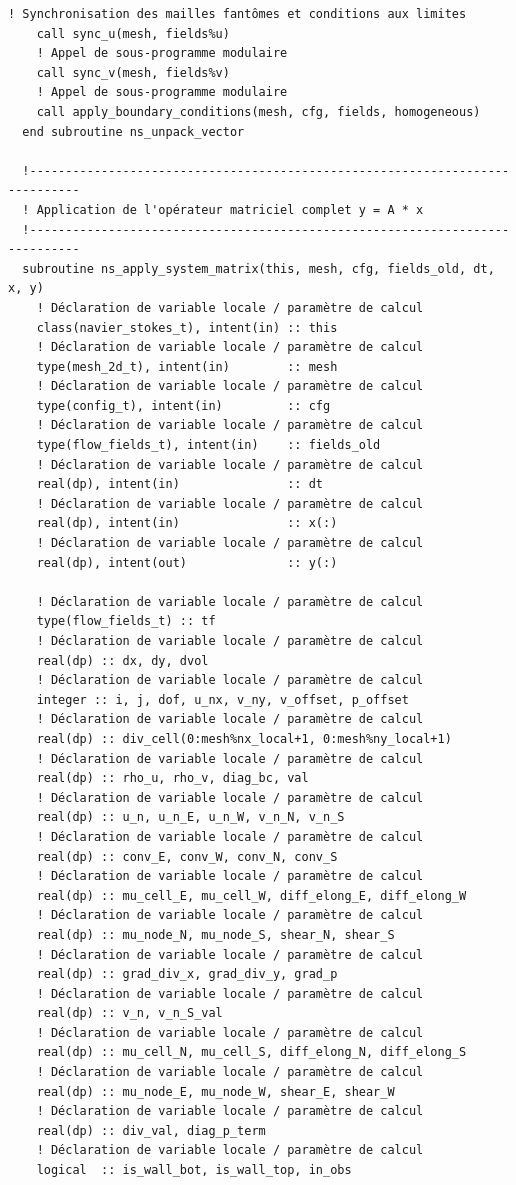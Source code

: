 \documentclass[10pt,a4paper,oneside]{book}
\begin{document}
\begin{lstlisting}[language={[95]Fortran}]
    ! Synchronisation des mailles fantômes et conditions aux limites
    call sync_u(mesh, fields%u)
    ! Appel de sous-programme modulaire
    call sync_v(mesh, fields%v)
    ! Appel de sous-programme modulaire
    call apply_boundary_conditions(mesh, cfg, fields, homogeneous)
  end subroutine ns_unpack_vector

  !-----------------------------------------------------------------------------
  ! Application de l'opérateur matriciel complet y = A * x
  !-----------------------------------------------------------------------------
  subroutine ns_apply_system_matrix(this, mesh, cfg, fields_old, dt, x, y)
    ! Déclaration de variable locale / paramètre de calcul
    class(navier_stokes_t), intent(in) :: this
    ! Déclaration de variable locale / paramètre de calcul
    type(mesh_2d_t), intent(in)        :: mesh
    ! Déclaration de variable locale / paramètre de calcul
    type(config_t), intent(in)         :: cfg
    ! Déclaration de variable locale / paramètre de calcul
    type(flow_fields_t), intent(in)    :: fields_old
    ! Déclaration de variable locale / paramètre de calcul
    real(dp), intent(in)               :: dt
    ! Déclaration de variable locale / paramètre de calcul
    real(dp), intent(in)               :: x(:)
    ! Déclaration de variable locale / paramètre de calcul
    real(dp), intent(out)              :: y(:)

    ! Déclaration de variable locale / paramètre de calcul
    type(flow_fields_t) :: tf
    ! Déclaration de variable locale / paramètre de calcul
    real(dp) :: dx, dy, dvol
    ! Déclaration de variable locale / paramètre de calcul
    integer :: i, j, dof, u_nx, v_ny, v_offset, p_offset
    ! Déclaration de variable locale / paramètre de calcul
    real(dp) :: div_cell(0:mesh%nx_local+1, 0:mesh%ny_local+1)
    ! Déclaration de variable locale / paramètre de calcul
    real(dp) :: rho_u, rho_v, diag_bc, val
    ! Déclaration de variable locale / paramètre de calcul
    real(dp) :: u_n, u_n_E, u_n_W, v_n_N, v_n_S
    ! Déclaration de variable locale / paramètre de calcul
    real(dp) :: conv_E, conv_W, conv_N, conv_S
    ! Déclaration de variable locale / paramètre de calcul
    real(dp) :: mu_cell_E, mu_cell_W, diff_elong_E, diff_elong_W
    ! Déclaration de variable locale / paramètre de calcul
    real(dp) :: mu_node_N, mu_node_S, shear_N, shear_S
    ! Déclaration de variable locale / paramètre de calcul
    real(dp) :: grad_div_x, grad_div_y, grad_p
    ! Déclaration de variable locale / paramètre de calcul
    real(dp) :: v_n, v_n_S_val
    ! Déclaration de variable locale / paramètre de calcul
    real(dp) :: mu_cell_N, mu_cell_S, diff_elong_N, diff_elong_S
    ! Déclaration de variable locale / paramètre de calcul
    real(dp) :: mu_node_E, mu_node_W, shear_E, shear_W
    ! Déclaration de variable locale / paramètre de calcul
    real(dp) :: div_val, diag_p_term
    ! Déclaration de variable locale / paramètre de calcul
    logical  :: is_wall_bot, is_wall_top, in_obs


\end{lstlisting}
\end{document}

